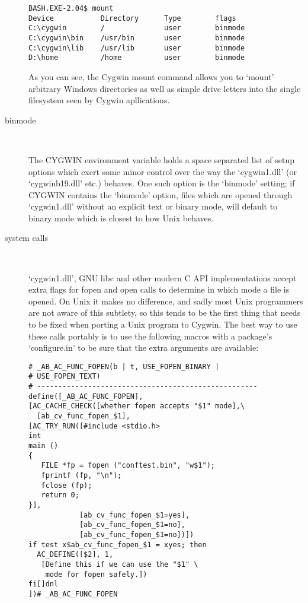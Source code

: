 \begin{description}
\begin{Verbatim}[frame=single]
BASH.EXE-2.04$ mount
Device           Directory      Type        flags
C:\cygwin        /              user        binmode
C:\cygwin\bin    /usr/bin       user        binmode
C:\cygwin\lib    /usr/lib       user        binmode
D:\home          /home          user        binmode
\end{Verbatim}

    As you can see, the Cygwin mount command allows you to `mount' arbitrary Windows directories as well as simple drive letters into the single filesystem seen by Cygwin apllications.

\item[binmode]
\

    The CYGWIN environment variable holds a space separated list of setup options which exert some minor control over the way the `cygwin1.dll' (or `cygwinb19.dll' etc.) behaves. One such option is the `binmode' setting; if CYGWIN contains the `binmode' option, files which are opened through `cygwin1.dll' without an explicit text or binary mode, will default to binary mode which is closest to how Unix behaves.

\item[system calls]
\

    `cygwin1.dll', GNU libc and other modern C API implementations accept extra flags for fopen and open calls to determine in which mode a file is opened. On Unix it makes no difference, and sadly most Unix programmers are not aware of this subtlety, so this tends to be the first thing that needs to be fixed when porting a Unix program to Cygwin. The best way to use these calls portably is to use the following macros with a package's `configure.in' to be sure that the extra arguments are available:

\begin{Verbatim}[frame=single]
# _AB_AC_FUNC_FOPEN(b | t, USE_FOPEN_BINARY | 
# USE_FOPEN_TEXT)
# ----------------------------------------------------
define([_AB_AC_FUNC_FOPEN],
[AC_CACHE_CHECK([whether fopen accepts "$1" mode],\
  [ab_cv_func_fopen_$1],
[AC_TRY_RUN([#include <stdio.h>
int
main ()
{
   FILE *fp = fopen ("conftest.bin", "w$1");
   fprintf (fp, "\n");
   fclose (fp);
   return 0;
}],
            [ab_cv_func_fopen_$1=yes],
            [ab_cv_func_fopen_$1=no],
            [ab_cv_func_fopen_$1=no])])
if test x$ab_cv_func_fopen_$1 = xyes; then
  AC_DEFINE([$2], 1,
   [Define this if we can use the "$1" \
    mode for fopen safely.])
fi[]dnl
])# _AB_AC_FUNC_FOPEN


\end{Verbatim}
\end{description}
